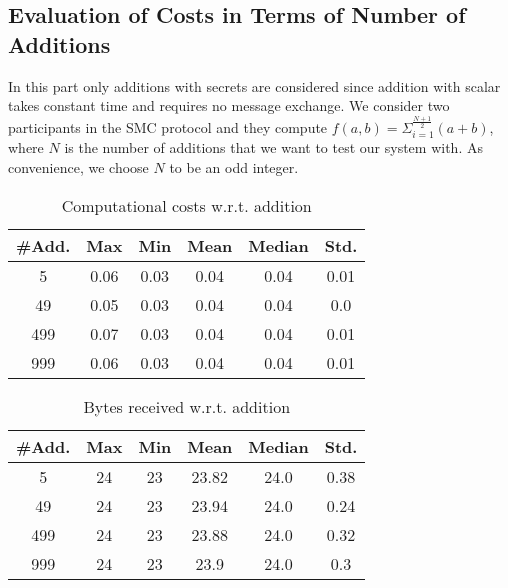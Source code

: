 \documentclass[9pt,conference]{IEEEtran}
\begin{document}
\subsection{Evaluation of Costs in Terms of Number of Additions}
In this part only additions with secrets are considered since addition with scalar takes constant time and requires no message exchange. We consider two participants in the SMC protocol and they compute $f(a,b)=\Sigma_{i=1}^{\frac{N+1}{2}}(a+b)$, where $N$ is the number of additions that we want to test our system with. As convenience, we choose $N$ to be an odd integer.

\begin{table}[H]
\caption{Computational costs w.r.t. addition} %
\centering %
\begin{tabular}{c c c c c c} %
\hline\hline %
\#Add. & Max & Min & Mean & Median & Std.\\ [0.5ex] %
\hline %
5 & 0.06  & 0.03 & 0.04 & 0.04 & 0.01 \\ %
49 &0.05 &0.03 &0.04 &0.04 &0.0    \\
499 &0.07 &0.03 &0.04 &0.04 &0.01 \\
999 &0.06 &0.03 &0.04 &0.04 &0.01\\ [1ex] %
\hline %
\end{tabular}
\label{table:numberadditioncc} %
\end{table}

\begin{table}[H]
\caption{Bytes received w.r.t. addition} %
\centering %
\begin{tabular}{c c c c c c} %
\hline\hline %
\#Add. & Max & Min & Mean & Median & Std.\\ [0.5ex] %
\hline %
5 & 24  & 23 & 23.82 & 24.0 & 0.38 \\ %
49 &24 &23 &23.94 &24.0 &0.24    \\
499 &24 &23 &23.88 &24.0 &0.32 \\
999 &24 &23 &23.9 &24.0 &0.3\\ [1ex] %
\hline %
\end{tabular}
\label{table:numberadditionrb} %
\end{table}
\end{document}
